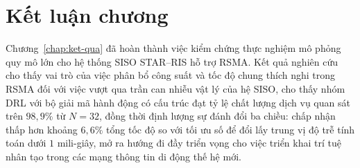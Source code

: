 \section{Kết luận chương}
\label{sec:ch4-ket-luan}

Chương~\ref{chap:ket-qua} đã hoàn thành việc kiểm chứng thực nghiệm mô phỏng quy mô lớn cho hệ thống SISO STAR--RIS
hỗ trợ RSMA. Kết quả nghiên cứu cho thấy vai trò của việc phân bổ công suất và tốc độ chung thích nghi trong RSMA
đối với việc vượt qua trần can nhiễu vật lý của hệ SISO, cho thấy nhóm DRL với bộ giải mã hành động có cấu trúc đạt
tỷ lệ chất lượng dịch vụ quan sát trên $98,9\%$ từ $N = 32$, đồng thời định lượng sự đánh đổi ba chiều: chấp nhận
thấp hơn khoảng $6,6\%$ tổng tốc độ so với tối ưu số để đổi lấy trung vị độ trễ tính toán dưới $1$ mili-giây, mở ra
hướng đi đầy triển vọng cho việc triển khai trí tuệ nhân tạo trong các mạng thông tin di động thế hệ mới.
